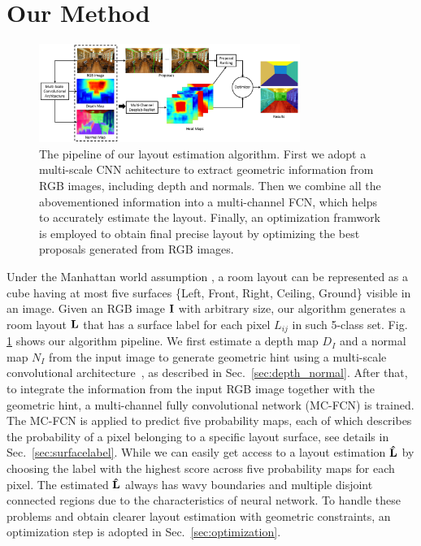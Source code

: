 \section{Our Method}
\label{sec:Meth}



\begin{figure}[!ht]
	\centering
	\includegraphics[width=8.5cm]{figure/ppline.png}
	\caption{The pipeline of our layout estimation algorithm. First we adopt a multi-scale CNN achitecture \cite{eigen2015predicting} to extract geometric information from RGB images, including depth and normals. Then we combine all the abovementioned information into a multi-channel FCN, which helps to accurately estimate the layout. Finally, an optimization framwork is employed to obtain final precise layout by optimizing the best proposals generated from RGB images.}
	\label{fig:pipeline}
\end{figure}

Under the Manhattan world assumption \cite{coughlan1999manhattan}, a room layout can be represented as a cube having at most five surfaces \{Left, Front, Right, Ceiling, Ground\} visible in an image. 
%
Given an RGB image $\mathbf{I}$ with arbitrary size, our algorithm generates a room layout $\mathbf{L}$ that has a surface label for each pixel $L_{ij} $ in such 5-class set. Fig. \ref{fig:pipeline} shows our algorithm pipeline. 
We first estimate a depth map $D_{I}$ and a normal map $N_{I}$ from the input image to generate geometric hint using a multi-scale convolutional architecture~\cite{eigen2015predicting}, as described in Sec.~\ref{sec:depth_normal}.
After that, to integrate the information from the input RGB image together with the geometric hint, a multi-channel fully convolutional network (MC-FCN) is trained. The MC-FCN is applied to predict five probability maps, each of which describes the probability of a pixel belonging to a specific layout surface, see details in Sec.~\ref{sec:surfacelabel}.
While we can easily get access to a layout estimation $\mathbf{\hat{L}}$ by choosing the label with the highest score across five probability maps for each pixel. 
The estimated $\mathbf{\hat{L}}$ always has wavy boundaries and multiple disjoint connected regions due to the characteristics of neural network. To handle these problems and obtain clearer layout estimation with geometric constraints, an optimization step is adopted in Sec.~\ref{sec:optimization}.  
 

